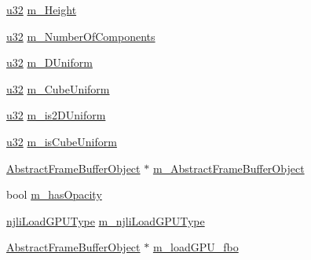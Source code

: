 \begin{DoxyCompactItemize}
\item 
\mbox{\hyperlink{_util_8h_a10e94b422ef0c20dcdec20d31a1f5049}{u32}} \mbox{\hyperlink{classnjli_1_1_material_property_a51e2a105287561c4417234e5a804fa32}{m\+\_\+\+Height}}
\item 
\mbox{\hyperlink{_util_8h_a10e94b422ef0c20dcdec20d31a1f5049}{u32}} \mbox{\hyperlink{classnjli_1_1_material_property_aa65bd34c711ad4a992d9c0cca0408502}{m\+\_\+\+Number\+Of\+Components}}
\item 
\mbox{\hyperlink{_util_8h_a10e94b422ef0c20dcdec20d31a1f5049}{u32}} \mbox{\hyperlink{classnjli_1_1_material_property_a71f667dc1a2ab962ed1d014b223c6c2d}{m\+\_\+D\+Uniform}}
\item 
\mbox{\hyperlink{_util_8h_a10e94b422ef0c20dcdec20d31a1f5049}{u32}} \mbox{\hyperlink{classnjli_1_1_material_property_a48374b6e4a3ec749e21499e76633606e}{m\+\_\+\+Cube\+Uniform}}
\item 
\mbox{\hyperlink{_util_8h_a10e94b422ef0c20dcdec20d31a1f5049}{u32}} \mbox{\hyperlink{classnjli_1_1_material_property_a6ca2655337c3335aa3188e4b0a202d0e}{m\+\_\+is2\+D\+Uniform}}
\item 
\mbox{\hyperlink{_util_8h_a10e94b422ef0c20dcdec20d31a1f5049}{u32}} \mbox{\hyperlink{classnjli_1_1_material_property_a24142b6247dd361b43102f83d2d8e36c}{m\+\_\+is\+Cube\+Uniform}}
\item 
\mbox{\hyperlink{classnjli_1_1_abstract_frame_buffer_object}{Abstract\+Frame\+Buffer\+Object}} $\ast$ \mbox{\hyperlink{classnjli_1_1_material_property_a6d09f742e5c768571d6a240648cfc488}{m\+\_\+\+Abstract\+Frame\+Buffer\+Object}}
\item 
bool \mbox{\hyperlink{classnjli_1_1_material_property_adda1b2988da4117aefb2d54ff735c13c}{m\+\_\+has\+Opacity}}
\item 
\mbox{\hyperlink{classnjli_1_1_material_property_ae02b26fdb8ff7968cc6def931e69855b}{njli\+Load\+G\+P\+U\+Type}} \mbox{\hyperlink{classnjli_1_1_material_property_a3ad0ce3f3e483eff600e95737228c218}{m\+\_\+njli\+Load\+G\+P\+U\+Type}}
\item 
\mbox{\hyperlink{classnjli_1_1_abstract_frame_buffer_object}{Abstract\+Frame\+Buffer\+Object}} $\ast$ \mbox{\hyperlink{classnjli_1_1_material_property_ad46878315683b289618fc02ade373381}{m\+\_\+load\+G\+P\+U\+\_\+fbo}}
\end{DoxyCompactItemize}
